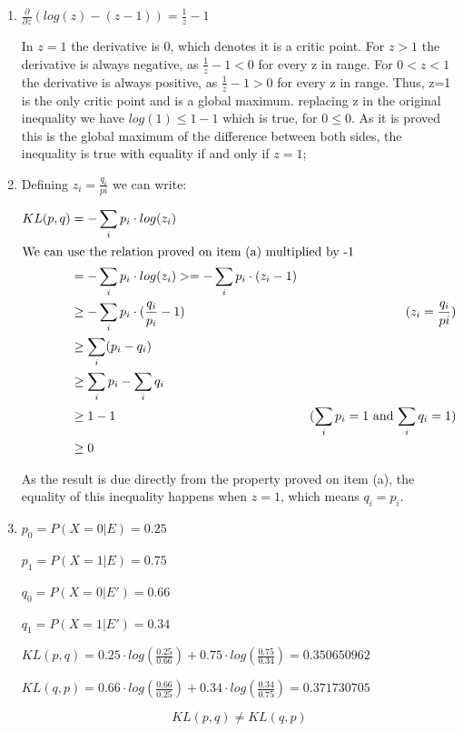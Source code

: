 \documentclass{article}
\begin{document}
\begin{enumerate}[label=(\alph*)]
\item
$\frac{\partial}{\partial z}(log(z)-(z-1))=\frac{1}{z}-1$

In $z=1$ the derivative is 0, which denotes it is a critic point. For $z>1$ the derivative is always negative, as $\frac{1}{z}-1<0$ for every z in range. 
For $0<z<1$ the derivative is always positive, as $\frac{1}{z}-1>0$ for every z in range. Thus, z=1 is the only critic point and is a global maximum. replacing z in the original inequality we have $log(1)\leq1-1$ which is true, for $0\leq0$. As it is proved this is the global maximum of the difference between both sides, the inequality is true with equality if and only if $z=1$;

\item
Defining $z_i=\frac{q_i}{pi}$ we can write:


\begin{align*}
KL(p,q) &=-\sum_i p_i \cdot log(z_i)\\
\intertext{We can use the relation proved on item (a) multiplied by -1} 
& =-\sum_i p_i \cdot log(z_i) >=  -\sum_ip_i \cdot (z_i-1)\\
& \geq -\sum_i p_i \cdot (\frac{q_i}{p_i}-1) & \text{($z_i=\frac{q_i}{pi}$)}\\
& \geq \sum_i (p_i-q_i)\\
& \geq \sum_i p_i- \sum_i q_i\\
& \geq 1-1 & \text{($\sum_i p_i=1$ and $\sum_i q_i=1$)}\\
& \geq 0
\end{align*}

As the result is due directly from the property proved on item (a), the equality of this inequality happens when $z=1$, which means $q_i=p_i$.

\item
$p_0=P(X=0|E)=0.25$

$p_1=P(X=1|E)=0.75$

$q_0=P(X=0|E')=0.66$

$q_1=P(X=1|E')=0.34$

$KL(p,q)=0.25 \cdot log(\frac{0.25}{0.66})+0.75 \cdot log(\frac{0.75}{0.34}) = 0.350650962$

$KL(q,p)=0.66 \cdot log(\frac{0.66}{0.25})+0.34 \cdot log(\frac{0.34}{0.75}) = 0.371730705$

$$KL(p,q) \neq KL(q,p)$$
\end{enumerate}
\end{document}
